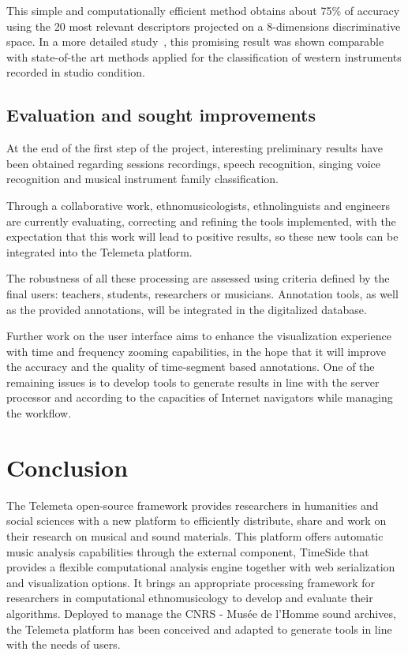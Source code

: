 \documentclass{sig-alternate}
\begin{document}
This simple and computationally efficient method obtains about 75\% of accuracy 
using the 20 most relevant descriptors projected on a 8-dimensions discriminative space. In a more detailed study~\cite{ismir14_dfourer},
this promising result was shown comparable with state-of-the art methods applied for the classification of western instruments recorded in studio condition.



\subsection{Evaluation and sought improvements}

At the end of the first step of the project, interesting preliminary results have been obtained regarding sessions recordings, speech recognition, singing voice recognition and musical instrument family classification.

Through a collaborative work, ethnomusicologists, ethnolinguists and engineers are currently evaluating, correcting and refining the tools implemented, with the expectation that this work will lead to positive results, so these new tools can be integrated into the Telemeta platform. 

The robustness of all these processing are assessed using criteria defined by the final users: teachers, students, researchers or musicians. Annotation tools, as well as the provided annotations, will be integrated in the digitalized database. 

Further work on the user interface aims to enhance the visualization experience with time and frequency zooming capabilities, in the hope that it will improve the accuracy and the quality of time-segment based annotations. One of the remaining issues is to develop tools to generate results in line with the server processor and according to the capacities of Internet navigators while managing the workflow. 


\section{Conclusion}
 The Telemeta open-source framework provides researchers in humanities and social sciences with a new platform to efficiently distribute, share and work on their research on musical and sound materials. 
This platform offers automatic music analysis capabilities through the external component, TimeSide that provides a flexible computational analysis engine together with web serialization and visualization options. 
It brings an appropriate processing framework for researchers in computational ethnomusicology to develop and evaluate their algorithms. 
Deployed to manage the CNRS - Musée de l’Homme sound archives, the Telemeta platform has been conceived and adapted to generate tools in line with the needs of users. 
\end{document}
